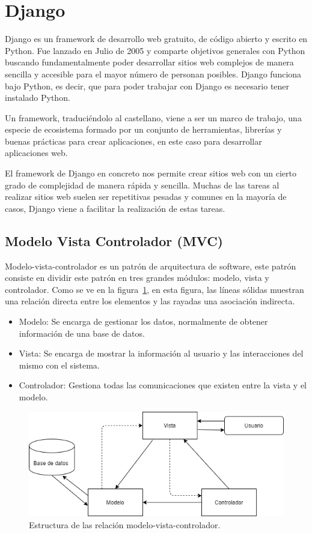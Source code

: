\documentclass[a4paper, 12pt]{book}
\begin{document}
  
\section{Django}
\label{sec:django}
Django es un framework de desarrollo web gratuito, de código abierto y escrito en Python. Fue lanzado en Julio de 2005 y comparte objetivos generales con Python buscando fundamentalmente poder desarrollar sitios web complejos de manera sencilla y accesible para el mayor número de personan posibles. Django funciona bajo Python, es decir, que para poder trabajar con Django es necesario tener instalado Python. 

Un framework, traduciéndolo al castellano, viene a ser un marco de trabajo, una especie de ecosistema formado por un conjunto de herramientas, librerías y buenas prácticas para crear aplicaciones, en este caso para desarrollar aplicaciones web. 

El framework de Django en concreto nos permite crear sitios web con un cierto grado de complejidad de manera rápida y sencilla. Muchas de las tareas al realizar sitios web suelen ser repetitivas pesadas y comunes en la mayoría de casos, Django viene a facilitar la realización de estas tareas. 

\subsection{Modelo Vista Controlador (MVC)}
\label{sec:modelo-vista-controlador}
Modelo-vista-controlador es un patrón de arquitectura de software, este patrón consiste en dividir este patrón en tres grandes módulos: modelo, vista y controlador. Como se ve en la figura~\ref{fig:arquitectura}, en esta figura, las líneas sólidas muestran una relación directa entre los elementos y las rayadas una asociación indirecta.

\begin{itemize}
 \item Modelo: Se encarga de gestionar los datos, normalmente de obtener información de una base de datos. 
 \item Vista: Se encarga de mostrar la información al usuario y las interacciones del mismo con el sistema. 
 \item Controlador: Gestiona todas las comunicaciones que existen entre la vista y el modelo. 
\end{itemize}

\begin{figure}
	\centering
	\includegraphics[width=12cm, keepaspectratio]{img/model-vista-controlador.png}
	\caption{Estructura de las relación modelo-vista-controlador.}
	\label{fig:arquitectura}
\end{figure}
\end{document}
